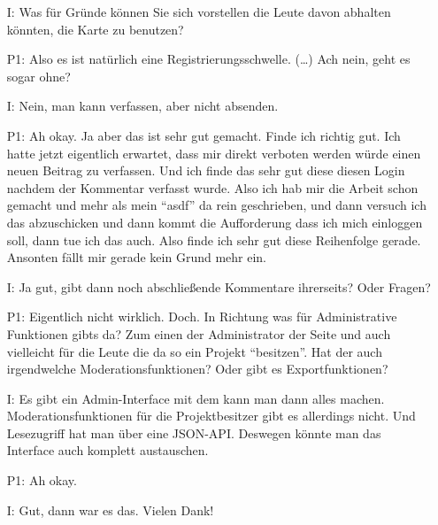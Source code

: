 \begin{itemize}
    \item[I:] Was f{\"u}r Gr{\"u}nde k{\"o}nnen Sie sich vorstellen die Leute davon abhalten k{\"o}nnten, die Karte zu benutzen?
    \item[P1:] Also es ist nat{\"u}rlich eine Registrierungsschwelle. (\dots) Ach nein, geht es sogar ohne?
    \item[I:] Nein, man kann verfassen, aber nicht absenden.
    \item[P1:] Ah okay. Ja aber das ist sehr gut gemacht. Finde ich richtig gut. Ich hatte jetzt eigentlich erwartet, dass mir direkt verboten werden w{\"u}rde einen neuen Beitrag zu verfassen. Und ich finde das sehr gut diese diesen Login nachdem der Kommentar verfasst wurde. Also ich hab mir die Arbeit schon gemacht und mehr als mein "`asdf"' da rein geschrieben, und dann versuch ich das abzuschicken und dann kommt die Aufforderung dass ich mich einloggen soll, dann tue ich das auch. Also finde ich sehr gut diese Reihenfolge gerade. Ansonten f{\"a}llt mir gerade kein Grund mehr ein. 	 
    \item[I:] Ja gut, gibt dann noch abschlie{\ss}ende Kommentare ihrerseits? Oder Fragen?
    \item[P1:] Eigentlich nicht wirklich. Doch. In Richtung was f{\"u}r Administrative Funktionen gibts da? Zum einen der Administrator der Seite und auch vielleicht f{\"u}r die Leute die da so ein Projekt "`besitzen"'. Hat der auch irgendwelche Moderationsfunktionen? Oder gibt es Exportfunktionen?
    \item[I:] Es gibt ein Admin-Interface mit dem kann man dann alles machen. Moderationsfunktionen f{\"u}r die Projektbesitzer gibt es allerdings nicht. Und Lesezugriff hat man {\"u}ber eine JSON-API. Deswegen k{\"o}nnte man das Interface auch komplett austauschen.
    \item[P1:] Ah okay.
    \item[I:] Gut, dann war es das. Vielen Dank!
\end{itemize}

